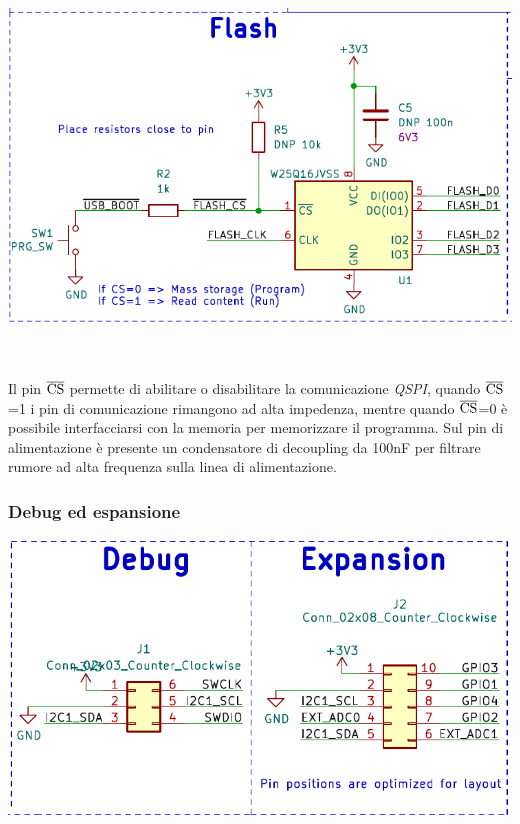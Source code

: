 \begin{center}
\includegraphics[width=6.5in,height=4.05556in]{figures/image49.png}
\captionsetup{type=figure}
\end{center}

Il pin $\overline{\rm {CS}}$ permette di abilitare o
disabilitare la comunicazione \emph{QSPI}, quando $\overline{\rm {CS}}$=1 i pin di
comunicazione rimangono ad alta impedenza, mentre quando $\overline{\rm {CS}}$=0 è
possibile interfacciarsi con la memoria per memorizzare il programma.
Sul pin di alimentazione è presente un condensatore di decoupling da 100nF per filtrare rumore ad alta
frequenza sulla linea di alimentazione.

\hypertarget{debug-ed-espansione}{%
\subsubsection{\texorpdfstring{\hfill\break
Debug ed espansione}{ Debug ed espansione}}\label{debug-ed-espansione}}

\begin{center}
\includegraphics[scale=0.8]{figures/image90.png}
\captionsetup{type=figure}
\end{center}

